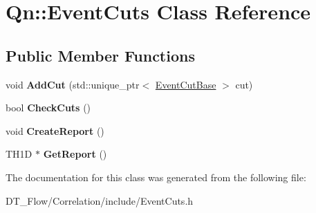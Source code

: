 \hypertarget{classQn_1_1EventCuts}{}\section{Qn\+:\+:Event\+Cuts Class Reference}
\label{classQn_1_1EventCuts}
\subsection*{Public Member Functions}
\begin{DoxyCompactItemize}
\item 
\mbox{\label{classQn_1_1EventCuts_affffb64a524dcb4bec6131a0230c8ef6}} 
void {\bfseries Add\+Cut} (std\+::unique\+\_\+ptr$<$ \mbox{\hyperlink{structQn_1_1EventCutBase}{Event\+Cut\+Base}} $>$ cut)
\item 
\mbox{\label{classQn_1_1EventCuts_aa3eb08d5155be6fd306e8ce24ce27e38}} 
bool {\bfseries Check\+Cuts} ()
\item 
\mbox{\label{classQn_1_1EventCuts_a63966f0a27f1dd066bb47f6cdafc32d5}} 
void {\bfseries Create\+Report} ()
\item 
\mbox{\label{classQn_1_1EventCuts_ae574bd7245c97729848a3d7ab098f281}} 
T\+H1D $\ast$ {\bfseries Get\+Report} ()
\end{DoxyCompactItemize}


The documentation for this class was generated from the following file\+:\begin{DoxyCompactItemize}
\item 
D\+T\+\_\+\+Flow/\+Correlation/include/Event\+Cuts.\+h\end{DoxyCompactItemize}
